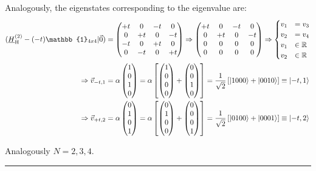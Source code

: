 \documentclass{article}
\newcommand{\lreck}[1]{\left[#1\right]}
\begin{document}
{	Analogously, the eigenstates corresponding to the eigenvalue  are:
		\begin{align*}
			(\underline{H}_\text{H}^{(2)} - (-t)\mathbb{1}_{4x4} | \vec{0}) &=
			\begin{pmatrix}
				+t & 0 & -t & 0 \\
				0 & +t & 0 & -t \\
				-t & 0 & +t & 0 \\
				0 & -t & 0 & +t
			\end{pmatrix}
			\Rightarrow
			\begin{pmatrix}
				+t & 0 & -t & 0 \\
				0 & +t & 0 & -t \\
				0 & 0 & 0 & 0 \\
				0 & 0 & 0 & 0
			\end{pmatrix}
			\Rightarrow
			\begin{cases}
				v_1 &= v_3 \\
				v_2 &= v_4 \\
				v_1 &\in \mathbb{R} \\
				v_2 &\in \mathbb{R}
			\end{cases} \\
			\Rightarrow \vec{v}_{-t,1} &= \alpha
			\begin{pmatrix}
				1\\0\\1\\0
			\end{pmatrix}
			=
			\alpha
			\lreck{
			\begin{pmatrix}
				1\\0\\0\\0
			\end{pmatrix}
			+
			\begin{pmatrix}
				0\\0\\1\\0
			\end{pmatrix}
			}
			=
			\frac{1}{\sqrt{2}}
			\lreck{ \ket{1000} + \ket{0010} } \equiv \ket{-t,1} \\
			\Rightarrow \vec{v}_{+t,2} &= \alpha
			\begin{pmatrix}
				0\\1\\0\\1
			\end{pmatrix}
			=
			\alpha
			\lreck{
			\begin{pmatrix}
				0\\1\\0\\0
			\end{pmatrix}
			+
			\begin{pmatrix}
				0\\0\\0\\1
			\end{pmatrix}
			}
			=
			\frac{1}{\sqrt{2}}
			\lreck{ \ket{0100} + \ket{0001} } \equiv \ket{-t,2}
		\end{align*}
	
	Analogously $N=2,3,4$.
\hrule
}
\end{document}
